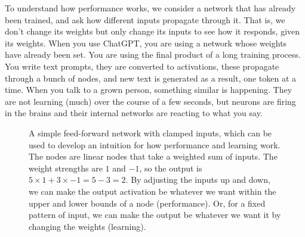 To understand how performance works, we consider a network that has already been trained, and ask how different inputs propagate through it. That is, we don't change its weights but only change its inputs to see how it responds, given its weights. When you use ChatGPT, you are using a network whose weights have already been set. You are using the final product of a long training process. You write text prompts, they are converted to activations, these propagate through a bunch of nodes, and new text is generated as a result, one token at a time.  When you talk to a grown person, something similar is happening. They are not learning (much) over the course of a few seconds, but neurons are firing in the brains and their internal networks are reacting to what you say.  

\begin{figure}[h]
\centering
{}
\caption[Simbrain screenshot.]{A simple feed-forward network with clamped inputs, which can be used to develop an intuition for how performance and learning work. The nodes are linear nodes that take a weighted sum of inputs. The weight strengths are $1$ and $-1$, so the output is $5 \times 1 + 3 \times -1 = 5 - 3 = 2$. By adjusting the inputs up and down, we can make the output activation be whatever we want within the upper and lower bounds of a node (performance). Or, for a fixed pattern of input, we can make the output be whatever we want it by changing the weights (learning).}
\label{2NodeSimpleFF}
\end{figure}

